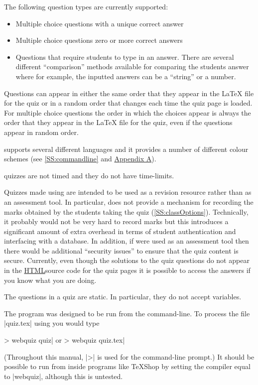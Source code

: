 \documentclass[svgnames]{article}
\newcommand{\HTML}{\href{https://www.w3schools.com/html/html_intro.asp}{HTML}}
\begin{document}
    The following question types are currently supported:
    \begin{itemize}
      \item Multiple choice questions with a unique correct answer
      \item Multiple choice questions zero or more correct answers
      \item Questions that require students to type in an answer. There
      are several different ``comparison'' methods available for
      comparing the students answer where
      for example, the inputted answers can be a ``string'' or a number.
    \end{itemize}

    Questions can appear in either the same order that they appear in
    the \LaTeX{} file for the quiz or in a random order that changes
    each time the quiz page is loaded. For multiple choice questions the
    order in which the choices appear is always the order that they
    appear in the \LaTeX{} file for the quiz, even if the questions
    appear in random order.

    \WebQuiz supports several different languages and it
    provides a number of different colour schemes (see
    \autoref{SS:commandline} and \hyperref[SS:themes]{Appendix A}).

    \WebQuiz quizzes are not timed and they do not have time-limits.

    Quizzes made using \WebQuiz are intended to be used as a
    revision resource rather than as an assessment tool. In particular,
    \WebQuiz does not provide a mechanism for recording the marks
    obtained by the students taking the quiz
    (\autoref{SS:classOptions}). Technically, it probably would not be
    very hard to record marks but this introduces a significant amount
    of extra overhead in terms of student authentication and interfacing
    with a database. In addition, if \WebQuiz were used as an assessment
    tool then there would be additional ``security issues'' to ensure
    that the quiz content is secure. Currently, even though the
    solutions to the quiz questions do not appear in the \HTML source
    code for the quiz pages it is possible to access the answers if you
    know what you are doing.

    The questions in a \WebQuiz quiz are static. In particular, they do
    not accept variables.

    The \WebQuiz program was designed to be run from the command-line.
    To process the file \BashCode|quiz.tex| using \WebQuiz you would
    type
    \begin{bashcode}
    > webquiz quiz|         or         > webquiz quiz.tex|
    \end{bashcode}
    (Throughout this manual, \BashCode|>| is used for the command-line
    prompt.) It should be possible to run \WebQuiz from inside programs
    like \TeX Shop by setting the compiler equal to \BashCode|webquiz|,
    although this is untested.
\end{document}
